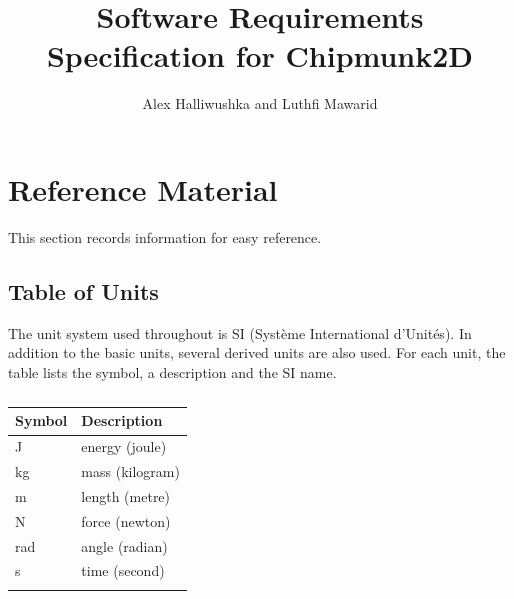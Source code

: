 \documentclass[12pt]{article}
\title{Software Requirements Specification for Chipmunk2D}
\author{Alex Halliwushka and Luthfi Mawarid}
\begin{document}
\maketitle
\tableofcontents
\newpage
\section{Reference Material}
\label{Sec:RefMat}
This section records information for easy reference.
\subsection{Table of Units}
\label{Sec:ToU}
The unit system used throughout is SI (Système International d'Unités). In addition to the basic units, several derived units are also used. For each unit, the table lists the symbol, a description and the SI name.
\begin{longtable}{l l}
\toprule
Symbol & Description
\\
\midrule
\endhead
J & energy (joule)
\\
kg & mass (kilogram)
\\
m & length (metre)
\\
N & force (newton)
\\
rad & angle (radian)
\\
s & time (second)
\\
\bottomrule
\caption{}
\label{Table:ToU}
\end{longtable}
\end{document}
